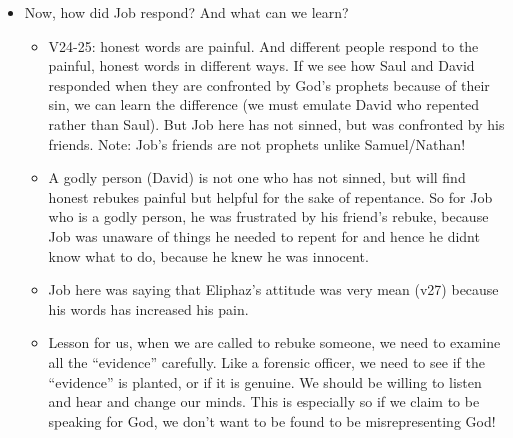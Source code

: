 \begin{itemize}
  \item{Now, how did Job respond? And what can we learn?
  \begin{itemize}
    \item{V24-25: honest words are painful. And different people respond to the painful, honest words in different ways. If we see how Saul and David responded when they are confronted by God’s prophets because of their sin, we can learn the difference (we must emulate David who repented rather than Saul). But Job here has not sinned, but was confronted by his friends. Note: Job's friends are not prophets unlike Samuel/Nathan! }
    \item{A godly person (David) is not one who has not sinned, but will find honest rebukes painful but helpful for the sake of repentance. So for Job who is a godly person, he was frustrated by his friend’s rebuke, because Job was unaware of things he needed to repent for and hence he didnt know what to do, because he knew he was innocent.}
    \item{Job here was saying that Eliphaz’s attitude was very mean (v27) because his words has increased his pain.} 
    \item{Lesson for us, when we are called to rebuke someone, we need to examine all the “evidence” carefully. Like a forensic officer, we need to see if the “evidence” is planted, or if it is genuine. We should be willing to listen and hear and change our minds. This is especially so if we claim to be speaking for God, we don't want to be found to be misrepresenting God!}
  \end{itemize}
  }
\end{itemize}